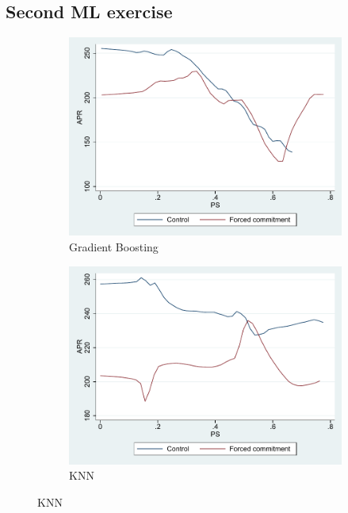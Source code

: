 \documentclass[oneside,11pt]{article}
\begin{document}
\subsection{Second ML exercise}




\begin{figure}[H]
    \caption{}
    \label{choose_wrong}
    \begin{center}
        \begin{subfigure}{0.45\textwidth}
        \caption{Gradient Boosting}
        \centering
        \includegraphics[width=\textwidth]{Figuras/ps_te_apr.pdf}
        
    \end{subfigure}
        \begin{subfigure}{0.45\textwidth}
        \caption{KNN}
        \centering
        \includegraphics[width=\textwidth]{Figuras/ps_te_apr1.pdf}
 \end{subfigure}
    \bigskip
        
    \end{center}
    
\end{figure}
\end{document}
